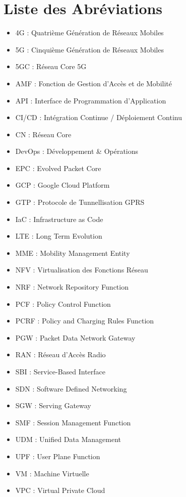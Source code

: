 \documentclass[12pt,a4paper]{report}
\begin{document}
\section*{Liste des Abréviations}
\begin{itemize}[label=--]
    \item 4G : Quatrième Génération de Réseaux Mobiles
    \item 5G : Cinquième Génération de Réseaux Mobiles
    \item 5GC : Réseau Core 5G
    \item AMF : Fonction de Gestion d'Accès et de Mobilité
    \item API : Interface de Programmation d'Application
    \item CI/CD : Intégration Continue / Déploiement Continu
    \item CN : Réseau Core
    \item DevOps : Développement \& Opérations
    \item EPC : Evolved Packet Core
    \item GCP : Google Cloud Platform
    \item GTP : Protocole de Tunnellisation GPRS
    \item IaC : Infrastructure as Code
    \item LTE : Long Term Evolution
    \item MME : Mobility Management Entity
    \item NFV : Virtualisation des Fonctions Réseau
    \item NRF : Network Repository Function
    \item PCF : Policy Control Function
    \item PCRF : Policy and Charging Rules Function
    \item PGW : Packet Data Network Gateway
    \item RAN : Réseau d'Accès Radio
    \item SBI : Service-Based Interface
    \item SDN : Software Defined Networking
    \item SGW : Serving Gateway
    \item SMF : Session Management Function
    \item UDM : Unified Data Management
    \item UPF : User Plane Function
    \item VM : Machine Virtuelle
    \item VPC : Virtual Private Cloud
\end{itemize}
\end{document}
